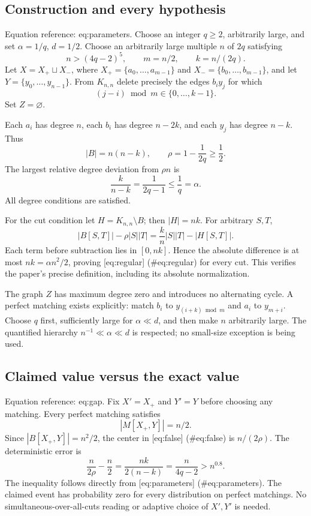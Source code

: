 \documentclass[10pt]{article}
\begin{document}
\subsection*{Construction and every hypothesis}
Equation reference: eq:parameters. Choose an integer \(q\geq2\), arbitrarily large, and set \(\alpha=1/q\), \(d=1/2\). Choose an arbitrarily large multiple \(n\) of \(2q\) satisfying \[
 n>(4q-2)^5,\qquad m=n/2,\qquad k=n/(2q).\] Let \(X=X_+\sqcup X_-\), where \(X_+=\{a_0,\ldots,a_{m-1}\}\) and \(X_-=\{b_0,\ldots,b_{m-1}\}\), and let \(Y=\{y_0,\ldots,y_{n-1}\}\). From \(K_{n,n}\) delete precisely the edges \(b_i y_j\) for which \[(j-i)\bmod m\in\{0,\ldots,k-1\}.\] Set \(Z=\varnothing\).\par
Each \(a_i\) has degree \(n\), each \(b_i\) has degree \(n-2k\), and each \(y_j\) has degree \(n-k\). Thus \[|B|=n(n-k),\qquad \rho=1-\frac1{2q}\geq\frac12.\] The largest relative degree deviation from \(\rho n\) is \[\frac{k}{n-k}=\frac1{2q-1}\leq\frac1q=\alpha.\] All degree conditions are satisfied.\par
For the cut condition let \(H=K_{n,n}\setminus B\); then \(|H|=nk\). For arbitrary \(S,T\), \[|B[S,T]|-\rho|S||T|=\frac{k}{n}|S||T|-|H[S,T]|.\] Each term before subtraction lies in \([0,nk]\). Hence the absolute difference is at most \(nk=\alpha n^2/2\), proving [eq:regular] (\#eq:regular) for every cut. This verifies the paper’s precise definition, including its absolute normalization.\par
The graph \(Z\) has maximum degree zero and introduces no alternating cycle. A perfect matching exists explicitly: match \(b_i\) to \(y_{(i+k)\bmod m}\) and \(a_i\) to \(y_{m+i}\). Choose \(q\) first, sufficiently large for \(\alpha\ll d\), and then make \(n\) arbitrarily large. The quantified hierarchy \(n^{-1}\ll\alpha\ll d\) is respected; no small-size exception is being used.\par
\subsection*{Claimed value versus the exact value}
Equation reference: eq:gap. Fix \(X'=X_+\) and \(Y'=Y\) before choosing any matching. Every perfect matching satisfies \[|M[X_+,Y]|=n/2.\] Since \(|B[X_+,Y]|=n^2/2\), the center in [eq:false] (\#eq:false) is \(n/(2\rho)\). The deterministic error is \[
 \frac{n}{2\rho}-\frac n2
 =\frac{nk}{2(n-k)}
 =\frac{n}{4q-2}>n^{0.8}.\] The inequality follows directly from [eq:parameters] (\#eq:parameters). The claimed event has probability zero for every distribution on perfect matchings. No simultaneous-over-all-cuts reading or adaptive choice of \(X',Y'\) is needed.\par
\end{document}
